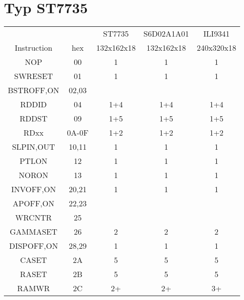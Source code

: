 \documentclass[pdftex,12pt,a4paper,oneside,english]{report}
\begin{document}
\section*{Typ ST7735}

\begin{table}[H]
  \begin{center}
    \begin{tabular}{| c | c || c | c | c |}
    \hline
                &       & ST7735     & S6D02A1A01 & ILI9341 \\
    Instruction & hex   & 132x162x18 & 132x162x18 & 240x320x18 \\
    \hline
    \hline
    NOP         & 00    &     1      &     1      &    1       \\
    \hline
    SWRESET     & 01    &     1      &     1      &    1       \\
    \hline
    BSTROFF,ON  & 02,03 &            &            &            \\
    \hline
    RDDID       & 04    &     1+4    &     1+4    &    1+4     \\
    \hline
    RDDST       & 09    &     1+5    &    1+5     &    1+5     \\
    \hline
    RDxx        & 0A-0F &   1+2      &    1+2     &    1+2     \\
    \hline
    SLPIN,OUT   & 10,11 &     1      &     1      &    1       \\
    \hline
    PTLON       & 12    &     1      &     1      &    1       \\
    \hline
    NORON       & 13    &     1      &     1      &    1       \\
    \hline
    INVOFF,ON   & 20,21 &   1        &     1      &    1       \\
    \hline
    APOFF,ON    & 22,23 &            &            &            \\
    \hline
    WRCNTR      & 25    &            &            &            \\
    \hline
    GAMMASET    & 26    &      2     &     2      &    2       \\
    \hline
    DISPOFF,ON  & 28,29 &    1       &     1      &    1       \\
    \hline
    CASET       & 2A    &     5      &     5      &    5       \\
    \hline
    RASET       & 2B    &     5      &     5      &    5       \\
    \hline
    RAMWR       & 2C    &     2+     &     2+     &    3+      \\

\end{tabular}
\end{center}
\end{table}
\end{document}
